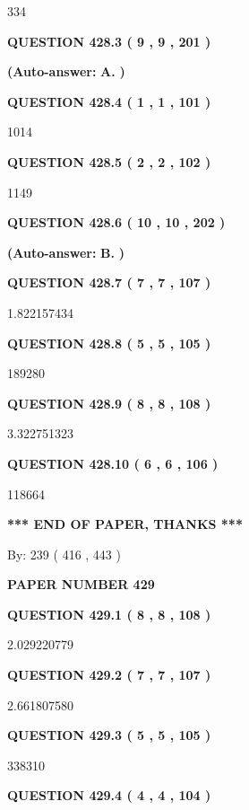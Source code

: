 \documentclass{ctexart}
\begin{document}
334
  
  
{\textbf{\large{QUESTION
428.3 
 ( 9 , 9 , 201 )
}}}
 
 
{\textbf{(Auto-answer:}}
{\textbf{\large{
A.}}}
{\textbf{)}}
 
 
  
  
{\textbf{\large{QUESTION
428.4 
 ( 1 , 1 , 101 )
}}}

1014
  
  
{\textbf{\large{QUESTION
428.5 
 ( 2 , 2 , 102 )
}}}

1149
  
  
{\textbf{\large{QUESTION
428.6 
 ( 10 , 10 , 202 )
}}}
 
 
{\textbf{(Auto-answer:}}
{\textbf{\large{
B.}}}
{\textbf{)}}
 
 
  
  
{\textbf{\large{QUESTION
428.7 
 ( 7 , 7 , 107 )
}}}

1.822157434
  
  
{\textbf{\large{QUESTION
428.8 
 ( 5 , 5 , 105 )
}}}

189280
  
  
{\textbf{\large{QUESTION
428.9 
 ( 8 , 8 , 108 )
}}}

3.322751323
  
  
{\textbf{\large{QUESTION
428.10 
 ( 6 , 6 , 106 )
}}}

118664
   
   
   
   
\vspace{1.0in} 
{\textbf{\large{ *** END OF PAPER, THANKS *** }}} 
   
   
\hspace{1.0in} By: 
 239 ( 416 ,  443 )
   
   
   
   
\newpage 
\setcounter{page}{ 
   429001 } 
   
   
 {\textbf{ \Large{ PAPER NUMBER  429  }}}
   
   
   
   
  
  
{\textbf{\large{QUESTION
429.1 
 ( 8 , 8 , 108 )
}}}

2.029220779
  
  
{\textbf{\large{QUESTION
429.2 
 ( 7 , 7 , 107 )
}}}

2.661807580
  
  
{\textbf{\large{QUESTION
429.3 
 ( 5 , 5 , 105 )
}}}

338310
  
  
{\textbf{\large{QUESTION
429.4 
 ( 4 , 4 , 104 )
}}}
\end{document}
